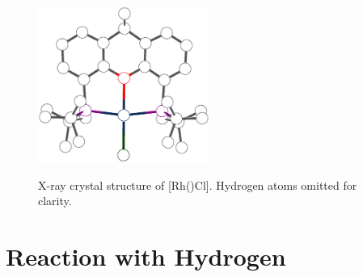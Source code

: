 \begin{figure}[htbp]
\begin{center}
\vspace{0.5cm}
\includegraphics[width=0.5\textwidth]{../Othercrystals/RhCtBuCl.eps}
\caption[X-ray crystal structure of [Rh(\tBuxantphosk)Cl{]}]{X-ray crystal structure of [Rh(\tBuxantphosk)Cl].  Hydrogen atoms omitted for clarity.\cite{Haibach2013}}
\vspace{0.2cm}
\label{crystal:RhCl}
\end{center}
\end{figure}
\vspace{0.2cm}


\section{Reaction with Hydrogen}
\label{section:rhodiumhydride}

